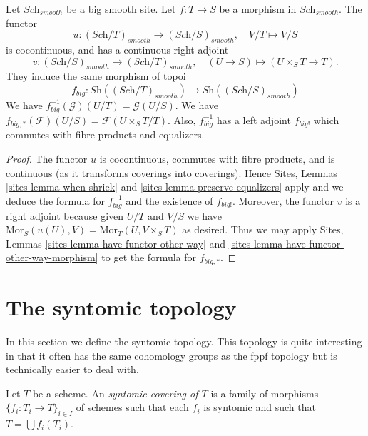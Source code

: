 \begin{lemma}
\label{lemma-morphism-big-smooth}
Let $\textit{Sch}_{smooth}$ be a big smooth site.
Let $f : T \to S$ be a morphism in $\textit{Sch}_{smooth}$.
The functor
$$
u : (\textit{Sch}/T)_{smooth} \longrightarrow (\textit{Sch}/S)_{smooth},
\quad
V/T \longmapsto V/S
$$
is cocontinuous, and has a continuous right adjoint
$$
v : (\textit{Sch}/S)_{smooth} \longrightarrow (\textit{Sch}/T)_{smooth},
\quad
(U \to S) \longmapsto (U \times_S T \to T).
$$
They induce the same morphism of topoi
$$
f_{big} :
\textit{Sh}((\textit{Sch}/T)_{smooth})
\longrightarrow
\textit{Sh}((\textit{Sch}/S)_{smooth})
$$
We have $f_{big}^{-1}(\mathcal{G})(U/T) = \mathcal{G}(U/S)$.
We have $f_{big, *}(\mathcal{F})(U/S) = \mathcal{F}(U\times_ST/T)$.
Also, $f_{big}^{-1}$ has a left adjoint $f_{big!}$ which commutes with
fibre products and equalizers.
\end{lemma}

\begin{proof}
The functor $u$ is cocontinuous, commutes with fibre products,
and is continuous (as it transforms coverings into coverings).
Hence Sites, Lemmas \ref{sites-lemma-when-shriek}
and \ref{sites-lemma-preserve-equalizers}
apply and we deduce the formula
for $f_{big}^{-1}$ and the existence of $f_{big!}$. Moreover,
the functor $v$ is a right adjoint because given $U/T$ and $V/S$
we have $\text{Mor}_S(u(U), V) = \text{Mor}_T(U, V\times_S T)$
as desired. Thus we may apply
Sites, Lemmas \ref{sites-lemma-have-functor-other-way} and
\ref{sites-lemma-have-functor-other-way-morphism} to get the
formula for $f_{big, *}$.
\end{proof}











\section{The syntomic topology}
\label{section-syntomic}

\noindent
In this section we define the syntomic topology.
This topology is quite interesting in that it often
has the same cohomology groups as the fppf topology
but is technically easier to deal with.

\begin{definition}
\label{definition-syntomic-covering}
Let $T$ be a scheme. An {\it syntomic covering of $T$} is a family
of morphisms $\{f_i : T_i \to T\}_{i \in I}$ of schemes
such that each $f_i$ is syntomic and such
that $T = \bigcup f_i(T_i)$.
\end{definition}

